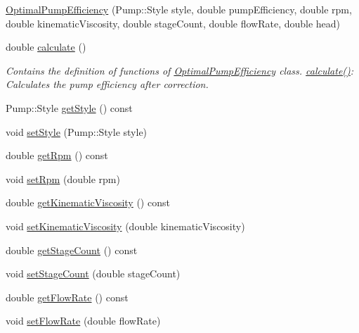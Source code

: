 \begin{DoxyCompactItemize}
\item 
\hyperlink{class_optimal_pump_efficiency_a5bc186f1a2bc5457a13d8d5aa4626d08}{Optimal\+Pump\+Efficiency} (Pump\+::\+Style style, double pump\+Efficiency, double rpm, double kinematic\+Viscosity, double stage\+Count, double flow\+Rate, double head)
\item 
double \hyperlink{class_optimal_pump_efficiency_ac40720d1fcdf40d8b364df37e58e7f4d}{calculate} ()
\begin{DoxyCompactList}\small\item\em Contains the definition of functions of \hyperlink{class_optimal_pump_efficiency}{Optimal\+Pump\+Efficiency} class. \hyperlink{class_optimal_pump_efficiency_ac40720d1fcdf40d8b364df37e58e7f4d}{calculate()}\+: Calculates the pump efficiency after correction. \end{DoxyCompactList}\item 
Pump\+::\+Style \hyperlink{class_optimal_pump_efficiency_a601fe15e9acc23112743fabe417030fb}{get\+Style} () const
\item 
void \hyperlink{class_optimal_pump_efficiency_ab6b85c8c08d6641c5375c65436f16a2f}{set\+Style} (Pump\+::\+Style style)
\item 
double \hyperlink{class_optimal_pump_efficiency_a58e8a430ced612e0518abd07fb30b085}{get\+Rpm} () const
\item 
void \hyperlink{class_optimal_pump_efficiency_afc6b6f46b4e289efc8819249ad1c9fb5}{set\+Rpm} (double rpm)
\item 
double \hyperlink{class_optimal_pump_efficiency_a8c2f7fcacce2b42ed83f29aec2d4671e}{get\+Kinematic\+Viscosity} () const
\item 
void \hyperlink{class_optimal_pump_efficiency_a00017e0bd100beb2f4b0bf2db5e3687f}{set\+Kinematic\+Viscosity} (double kinematic\+Viscosity)
\item 
double \hyperlink{class_optimal_pump_efficiency_aac0c1a4a6492bf00b245c2a61d100eaa}{get\+Stage\+Count} () const
\item 
void \hyperlink{class_optimal_pump_efficiency_a5b0b2a24a87c1c8fc92aa96c6ba4b727}{set\+Stage\+Count} (double stage\+Count)
\item 
double \hyperlink{class_optimal_pump_efficiency_a77c6618681b0fd3a0fc02dc49d16ee99}{get\+Flow\+Rate} () const
\item 
void \hyperlink{class_optimal_pump_efficiency_a90067b57c559fd3274fb8d6e00f6221d}{set\+Flow\+Rate} (double flow\+Rate)
\item 

\end{DoxyCompactItemize}
